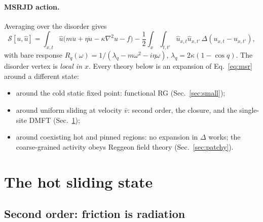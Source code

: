 \documentclass[10pt,a4paper]{article}
\begin{document}
\paragraph{MSRJD action.} Averaging over the disorder gives
\begin{equation}
\mathcal S[u,\hat u]=\int_{x,t}\hat u\big(m\ddot u+\eta\dot u-\kappa\nabla^2u-f\big)-\frac12\int_x\!\int_{t,t'}\hat u_{x,t}\hat u_{x,t'}\,\Delta(u_{x,t}-u_{x,t'}),
\label{eq:msr}
\end{equation}
with bare response $R_q(\omega)=1/(\lambda_q-m\omega^2-i\eta\omega)$, $\lambda_q=2\kappa(1-\cos q)$. The disorder vertex is \emph{local in $x$}. Every theory below is an expansion of Eq.~\eqref{eq:msr} around a different state:
\begin{itemize}
\item around the cold static fixed point: functional RG (Sec.~\ref{sec:small});
\item around uniform sliding at velocity $\bar v$: second order, the closure, and the single-site DMFT (Sec.~\ref{sec:hot});
\item around coexisting hot and pinned regions: no expansion in $\Delta$ works; the coarse-grained activity obeys Reggeon field theory (Sec.~\ref{sec:patchy}).
\end{itemize}

\section{The hot sliding state}
\label{sec:hot}

\subsection{Second order: friction is radiation}
\label{sec:second}
\end{document}
